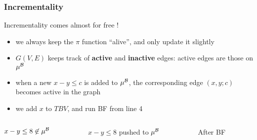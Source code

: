 \begin{frame}
  \frametitle{Incrementality}

  \scriptsize
  
  Incrementality comes almost for free !
  \vfill
  \begin{itemize}

    \item we always keep the $\pi$ function ``alive'', and only
          update it slightly
  \vfill

    \item $G(V,E)$ keeps track of {\bf active} and {\bf inactive}
          edges: active edges are those on $\mu^{\mathcal{B}}$
  \vfill

    \item when a new \tatom $x - y \leq c$ is added to $\mu^{\mathcal{B}}$, the
	  corresponding edge $(x,y;c)$ becomes active in the graph
  \vfill

    \item we add $x$ to $TBV$, and run BF from line 4

  \end{itemize}
  \vfill
  \begin{columns}

  \begin{column}{.3\textwidth}
  \begin{center}
    $x-y \leq 8 \not\in \mu^{\mathcal{B}}$ \\
    \medskip
    \scalebox{.7}{}
  \end{center} 
  \end{column}

  \pause

  \begin{column}{.3\textwidth}
  \begin{center}
    $x-y \leq 8$ pushed to $\mu^{\mathcal{B}}$ \\
    \medskip
    \scalebox{.7}{}
  \end{center} 
  \end{column}

  \pause

  \begin{column}{.3\textwidth}
  \begin{center}
    After BF \\
    \medskip
    \scalebox{.7}{}
  \end{center} 
  \end{column}

  \end{columns}

\end{frame}

